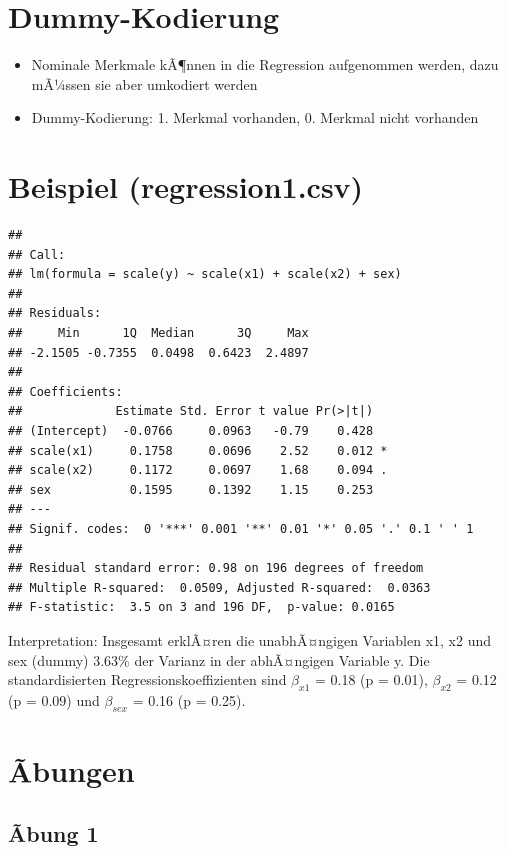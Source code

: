 \documentclass[
]{book}
\providecommand{\tightlist}{%
  \setlength{\itemsep}{0pt}\setlength{\parskip}{0pt}}
\begin{document}
\hypertarget{dummy-kodierung}{%
\section{Dummy-Kodierung}\label{dummy-kodierung}}

\begin{itemize}
\tightlist
\item
  Nominale Merkmale kÃ¶nnen in die Regression aufgenommen werden, dazu mÃ¼ssen sie aber umkodiert werden
\item
  Dummy-Kodierung: 1. Merkmal vorhanden, 0. Merkmal nicht vorhanden
\end{itemize}

\hypertarget{beispiel-regression1.csv}{%
\section{Beispiel (regression1.csv)}\label{beispiel-regression1.csv}}

\begin{verbatim}
## 
## Call:
## lm(formula = scale(y) ~ scale(x1) + scale(x2) + sex)
## 
## Residuals:
##     Min      1Q  Median      3Q     Max 
## -2.1505 -0.7355  0.0498  0.6423  2.4897 
## 
## Coefficients:
##             Estimate Std. Error t value Pr(>|t|)  
## (Intercept)  -0.0766     0.0963   -0.79    0.428  
## scale(x1)     0.1758     0.0696    2.52    0.012 *
## scale(x2)     0.1172     0.0697    1.68    0.094 .
## sex           0.1595     0.1392    1.15    0.253  
## ---
## Signif. codes:  0 '***' 0.001 '**' 0.01 '*' 0.05 '.' 0.1 ' ' 1
## 
## Residual standard error: 0.98 on 196 degrees of freedom
## Multiple R-squared:  0.0509, Adjusted R-squared:  0.0363 
## F-statistic:  3.5 on 3 and 196 DF,  p-value: 0.0165
\end{verbatim}

Interpretation: Insgesamt erklÃ¤ren die unabhÃ¤ngigen Variablen x1, x2 und sex (dummy) 3.63\% der Varianz in der abhÃ¤ngigen Variable y. Die standardisierten Regressionskoeffizienten sind \(\beta_{x1}\) = 0.18 (p = 0.01), \(\beta_{x2}\) = 0.12 (p = 0.09) und \(\beta_{sex}\) = 0.16 (p = 0.25).

\hypertarget{uxe3bungen}{%
\section{Ãbungen}\label{uxe3bungen}}

\hypertarget{uxe3bung-1-1}{%
\subsection{Ãbung 1}\label{uxe3bung-1-1}}
\end{document}
